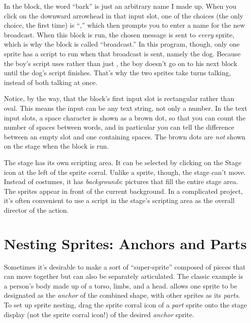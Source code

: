 \documentclass{report}
\begin{document}
In the  block, the word ``bark'' is just an arbitrary name I made up. When you click on the downward arrowhead in that input slot, one of the choices (the only choice, the first time) is ``,'' which then prompts you to enter a name for the new broadcast. When this block is run, the chosen message is sent to \emph{every} sprite, which is why the block is called ``broadcast.'' In this program, though, only one sprite has a script to run when that broadcast is sent, namely the dog. Because the boy's script uses  rather than just , the boy doesn't go on to his next  block until the dog's script finishes. That's why the two sprites take turns talking, instead of both talking at once.

Notice, by the way, that the  block's first input slot is rectangular rather than oval. This means the input can be any text string, not only a number. In the text input slots, a space character is shown as a brown dot, so that you can count the number of spaces between words, and in particular you can tell the difference between an empty slot and one containing spaces. The brown dots are \emph{not} shown on the stage when the block is run.

The stage has its own scripting area. It can be selected by clicking on the Stage icon at the left of the sprite corral. Unlike a sprite, though, the stage can't move. Instead of costumes, it has \emph{backgrounds}: pictures that fill the entire stage area. The sprites appear in front of the current background. In a complicated project, it's often convenient to use a script in the stage's scripting area as the overall director of the action.

\section{Nesting Sprites: Anchors and Parts}
\label{sec:nesting-sprites}

Sometimes it's desirable to make a sort of ``super-sprite'' composed of pieces that can move together but can also be separately articulated. The classic example is a person's body made up of a torso, limbs, and a head. \Snap{} allows one sprite to be designated as the \emph{anchor} of the combined shape, with other sprites as its \emph{parts}. To set up sprite nesting, drag the sprite corral icon of a \emph{part} sprite onto the stage display (not the sprite corral icon!) of the desired \emph{anchor} sprite.
\end{document}
